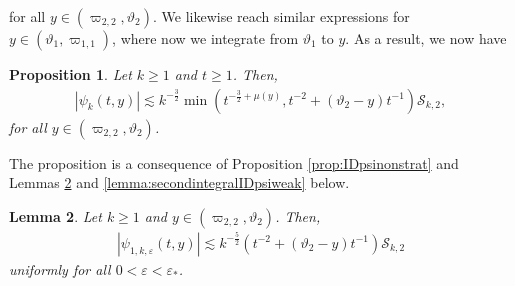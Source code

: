 \documentclass[11pt,reqno]{amsproc}
\newtheorem{proposition}{Proposition}[section]
\newtheorem{lemma}[proposition]{Lemma}
\theoremstyle{definition}
\numberwithin{equation}{section}
\newcommand{\cS}{{\mathcal S}}
\newcommand{\ep}{\varepsilon}
\begin{document}
for all $y\in (\varpi_{2,2}, \vartheta_2)$. We likewise reach similar expressions for $y\in (\vartheta_1,\varpi_{1,1})$, where now we integrate from $\vartheta_1$ to $y$. As a result, we now have

\begin{proposition}\label{prop:improvedIDpsiweak}
Let $k\geq 1$ and $t\geq 1$. Then, 
\begin{align*}
\left| \psi_k(t,y) \right| \lesssim k^{-\frac32}\min \left( t^{-\frac32+\mu(y)}, t^{-2} + (\vartheta_2-y)t^{-1} \right) \cS_{k,2},
\end{align*}
for all $y\in(\varpi_{2,2},\vartheta_2)$.
\end{proposition}

The proposition is a consequence of Proposition \ref{prop:IDpsinonstrat} and Lemmas \ref{lemma:firstintegralIDpsiweak} and \ref{lemma:secondintegralIDpsiweak} below.

\begin{lemma}\label{lemma:firstintegralIDpsiweak}
Let $k\geq 1$ and $y\in (\varpi_{2,2}, \vartheta_2)$. Then,
\begin{align*}
\left| \psi_{1,k,\ep}(t,y) \right| \lesssim k^{-\frac52}\left( t^{-2} + (\vartheta_2-y)t^{-1} \right)\cS_{k,2} 
\end{align*}
uniformly for all $0<\ep<\ep_*$.
\end{lemma}
\end{document}
